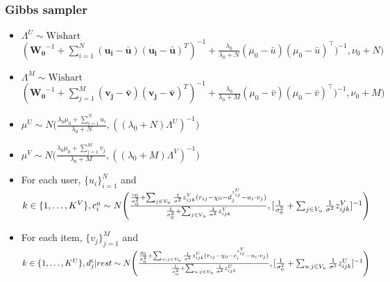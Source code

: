 \documentclass{article}
\begin{document}
\subsubsection{Gibbs sampler}

\begin{itemize}

\item $\Lambda^U \sim \text{Wishart}$
$\left(\mathbf{W_0}^{-1} + \sum_{i=1}^N (\mathbf{u_i} - \mathbf{\bar u}) (\mathbf{u_i} - \mathbf{\bar u})^T\right)^{-1} + \frac{\lambda_0}{\lambda_0 + N}(\mu_0 - \bar u)(\mu_0 - \bar u)^\top )^{-1}, \nu_0 + N) $

\item $\Lambda^M \sim \text{Wishart}$
$\left(\mathbf{W_0}^{-1} + \sum_{j=1}^M (\mathbf{v_j} - \mathbf{\bar v}) (\mathbf{v_j} - \mathbf{\bar v})^T\right)^{-1} + \frac{\lambda_0}{\lambda_0 + M}(\mu_0 - \bar v)(\mu_0 - \bar v)^\top )^{-1}, \nu_0 + M) $

\item $\mu^U \sim N \Big( \frac{\lambda_0 \mu_0 + \sum_{i=1}^N u_i}{\lambda_0 + N}, ((\lambda_0 + N) \Lambda^U)^{-1} \Big)$ \\

\item $\mu^V \sim N \Big( \frac{\lambda_0 \mu_0 + \sum_{j=1}^M v_j}{\lambda_0 + M}, ((\lambda_0 + M) \Lambda^V)^{-1} \Big)$ \\

\item For each user, $\{u_i\}_{i=1}^N$ and $k \in \{1, \ldots, K^V\}, \\
    c_i^u \sim N\Bigg(\frac{ \frac{c_0}{\sigma_0^2} + \sum_{j \in V_u} \frac{1}{\sigma^2} z_{ijk}^V(r_{ij} - \chi_0 - d_j^{z_{ij}^U} - u_i \cdot v_j)}{\frac{1}{\sigma_0^2} + \sum_{j \in V_u} \frac{1}{\sigma^2} z_{ijk}^V}, [\frac{1}{\sigma_0^2} + \sum_{j \in V_u} \frac{1}{\sigma^2} z_{ijk}^V]^{-1}    \Bigg) $


\item For each item, $\{v_j\}_{j=1}^M$ and $k \in \{1,\ldots, K^U\}, \\
    d_j^i | rest \sim N\Bigg(          
\frac{\frac{d_0}{\sigma_0^2} + \sum_{u: j \in V_u} \frac{1}{\sigma^2} z_{ijk}^U(r_{ij} - \chi_0 - c_i^{z_{ij}^V} - u_i \cdot v_j)}{\frac{1}{\sigma_0^2} + \sum_{u: j \in V_u} \frac{1}{\sigma^2} z_{ijk}^U}
, [\frac{1}{\sigma_0^2} + \sum_{u: j \in V_u} \frac{1}{\sigma^2} z_{ijk}^U]^{-1} \Bigg) $


\end{itemize}
\end{document}
